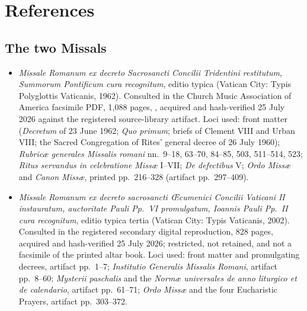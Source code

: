 \section{References}

\begingroup
\setlength{\parskip}{0pt}
\titlespacing*{\subsection}{0pt}{1.0ex}{0.3ex}

\subsection*{The two Missals}

{\fontsize{8.6}{9.6}\selectfont
\begin{itemize}[itemsep=0pt,parsep=0pt,topsep=0.05em]
\item \emph{Missale Romanum ex decreto Sacrosancti Concilii Tridentini restitutum, Summorum Pontificum cura recognitum}, editio typica (Vatican City: Typis Polyglottis Vaticanis, 1962). Consulted in the Church Music Association of America facsimile PDF, 1{,}088 pages, , acquired and hash-verified 25 July 2026 against the registered source-library artifact. Loci used: front matter (\emph{Decretum} of 23 June 1962; \emph{Quo primum}; briefs of Clement VIII and Urban VIII; the Sacred Congregation of Rites' general decree of 26 July 1960); \emph{Rubricæ generales Missalis romani} nn.~9--18, 63--70, 84--85, 503, 511--514, 523; \emph{Ritus servandus in celebratione Missæ} I--VII; \emph{De defectibus} V; \emph{Ordo Missæ} and \emph{Canon Missæ}, printed pp.~216--328 (artifact pp.~297--409).
\item \emph{Missale Romanum ex decreto sacrosancti Œcumenici Concilii Vaticani II instauratum, auctoritate Pauli Pp.~VI promulgatum, Ioannis Pauli Pp.~II cura recognitum}, editio typica tertia (Vatican City: Typis Vaticanis, 2002). Consulted in the registered secondary digital reproduction, 828 pages, acquired and hash-verified 25 July 2026; restricted, not retained, and not a facsimile of the printed altar book. Loci used: front matter and promulgating decrees, artifact pp.~1--7; \emph{Institutio Generalis Missalis Romani}, artifact pp.~8--60; \emph{Mysterii paschalis} and the \emph{Normæ universales de anno liturgico et de calendario}, artifact pp.~61--71; \emph{Ordo Missæ} and the four Eucharistic Prayers, artifact pp.~303--372.
\end{itemize}}

